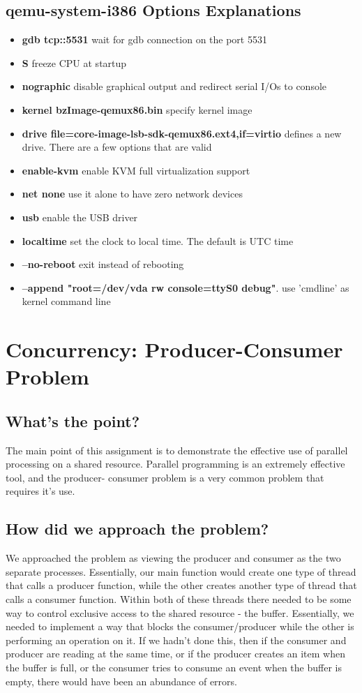 \documentclass{article}
\begin{document}
\subsection{qemu-system-i386 Options Explanations}
\begin{itemize}
\item \textbf{gdb tcp::5531}  wait for gdb connection on the port 5531
\item \textbf{S} freeze CPU at startup 
\item \textbf{nographic} disable graphical output and redirect serial I/Os to console
\item \textbf{kernel bzImage-qemux86.bin} specify kernel image
\item \textbf{drive file=core-image-lsb-sdk-qemux86.ext4,if=virtio}  defines a new drive. There are a few options that are valid
\item \textbf{enable-kvm} enable KVM full virtualization support
\item \textbf{net none} use it alone to have zero network devices
\item \textbf{usb} enable the USB driver 
\item \textbf{localtime} set the clock to local time. The default is UTC time
\item \textbf{--no-reboot} exit instead of rebooting
\item \textbf{--append "root=/dev/vda rw console=ttyS0 debug"}. use 'cmdline' as kernel command line
\end{itemize}

\section{Concurrency: Producer-Consumer Problem}
\subsection{What's the point?}

The main point of this assignment is to demonstrate the effective use of parallel processing on a shared resource. Parallel programming is an extremely effective tool, and the producer- consumer problem is a very common problem that requires it’s use.

\subsection{How did we approach the problem?}

We approached the problem as viewing the producer and consumer as the two separate processes. Essentially, our main function would create one type of thread that calls a producer function, while the other creates another type of thread that calls a consumer function. Within both of these threads there needed to be some way to control exclusive access to the shared resource - the buffer. Essentially, we needed to implement a way that blocks the consumer/producer while the other is performing an operation on it. If we hadn’t done this, then if the consumer and producer are reading at the same time, or if the producer creates an item when the buffer is full, or the consumer tries to consume an event when the buffer is empty, there would have been an abundance of errors.
\end{document}
